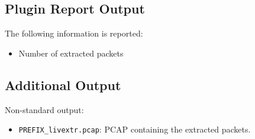 \documentclass[documentation]{subfiles}
\begin{document}
\subsection{Plugin Report Output}
The following information is reported:
\begin{itemize}
    \item Number of extracted packets
\end{itemize}

\subsection{Additional Output}
Non-standard output:
\begin{itemize}
    \item {\tt PREFIX\_livextr.pcap}: PCAP containing the extracted packets.
\end{itemize}
\end{document}
